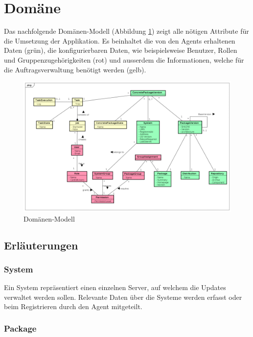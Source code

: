\section{Domäne}

Das nachfolgende Domänen-Modell (Abbildung \ref{fig:domainmodel}) zeigt alle nötigen Attribute für die Umsetzung der Applikation. Es beinhaltet die von den Agents erhaltenen Daten (grün), die konfigurierbaren Daten, wie beispielsweise Benutzer, Rollen und Gruppenzugehörigkeiten (rot) und ausserdem die Informationen, welche für die Auftragsverwaltung benötigt werden (gelb).

\begin{figure}
  \centering
    \includegraphics[width=\textwidth]{files/DomainModel_small}
  \caption{Domänen-Modell}
  \label{fig:domainmodel}
\end{figure}

\subsection*{Erläuterungen}

\subsubsection{System}

Ein System repräsentiert einen einzelnen Server, auf welchem die Updates verwaltet werden sollen. Relevante Daten über die Systeme werden erfasst oder beim Registrieren durch den Agent mitgeteilt.

\subsubsection{Package}

